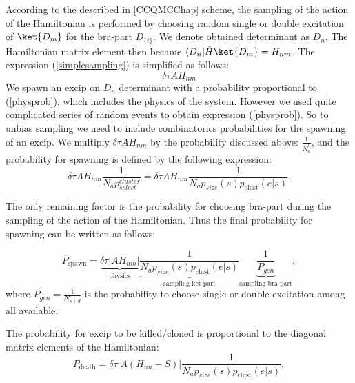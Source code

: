 \documentclass[twoside,english]{uiofysmaster}
\begin{document}
According to the described in \autoref{CCQMCChap} scheme, the sampling of the action of the Hamiltonian is performed by choosing random single or double excitation of $\ket{D_m}$ for the bra-part $D_{\{i\}}$. We denote obtained determinant as $D_n$. The Hamiltonian matrix element then became $\langle D_n|\hat{H}\ket{D_m} = H_{nm}$. The expression (\ref{simplesampling}) is simplified as follows:
\begin{equation}\label{physprob}
\delta \tau A H_{nm}
\end{equation}
We spawn an excip on $D_n$ determinant with a probability proportional to (\ref{physprob}), which includes the physics of the system. However we used quite complicated series of random events to obtain expression (\ref{physprob}). So to unbias sampling we need to include combinatorics probabilities for the spawning of an excip. We multiply $\delta \tau A H_{nm}$ by the probability discussed above:  $\frac{1}{N_a^\prime}$, and the probability for spawning is defined by the following expression:
\begin{equation}
\delta \tau A H_{nm} \frac{1}{N_a p_{select}^{cluster}} = \delta \tau A H_{nm} \frac{1}{N_a p_{size}(s) p_{\text{clust}} (e|s)}.
\end{equation}

The only remaining factor is the probability for choosing bra-part during the sampling of the action of the Hamiltonian. Thus the final probability for spawning can be written as follows:


\begin{equation}
P_{\text{spawn}} = \underbrace{\delta \tau |A H_{nm}|}_{\text{physics}} \underbrace{\frac{1}{N_a p_{size}(s) p_{\text{clust}} (e|s)}}_{\text{sampling ket-part}} \underbrace{\frac{1}{P_{gen}}}_{\text{sampling bra-part}},
\end{equation}
where $P_{gen}=\frac{1}{N_{s+d}}$ is the probability to choose single or double excitation among all available.

The probability for excip to be killed/cloned is proportional to the diagonal matrix elements of the Hamiltonian:
\begin{equation}
P_{\text{death}} = \delta \tau | A (H_{nn}-S) | \frac{1}{N_a p_{size}(s) p_{\text{clust}} (e|s)} ,
\end{equation}

\newpage
\end{document}
